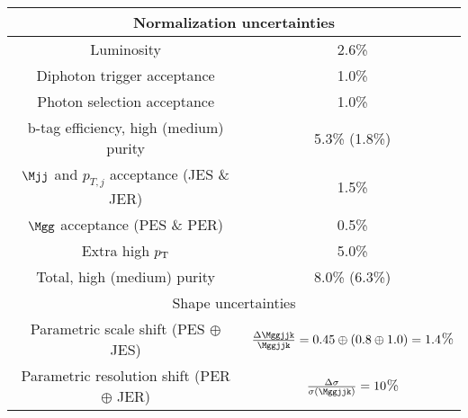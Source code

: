 \begin{tabular}{|c|c|}
\hline
\multicolumn{2}{|c|}{Normalization uncertainties} \\
\hline
Luminosity & 2.6\%\\
Diphoton trigger acceptance & 1.0\% \\
Photon selection acceptance & 1.0\% \\ 
b-tag efficiency, high (medium) purity & 5.3\% (1.8\%) \\  
$\Mjj$ and $p_{T, j}$ acceptance (JES \& JER) & 1.5\%\\
$\Mgg$ acceptance (PES \& PER) & 0.5\% \\
Extra high $p_{\rm T}$ & 5.0\% \\
\hline
Total, high (medium) purity & 8.0\% (6.3\%) \\
\hline
\hline
\multicolumn{2}{|c|}{Shape uncertainties} \\
\hline
Parametric scale shift (PES $\oplus$ JES) & $\frac{\Delta\Mggjjk}{\Mggjjk} = 0.45 \oplus (0.8 \oplus 1.0) = 1.4$\% \\
Parametric resolution shift (PER $\oplus$ JER) & $\frac{\Delta\sigma}{\sigma(\Mggjjk)} = 10$\% \\
\hline
\end{tabular}
